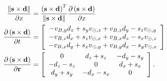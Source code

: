 \begin{align}
	\frac{\| \mathbf{s} \times \mathbf{d} \|}{\partial x} &= \frac{\left( \mathbf{s} \times \mathbf{d} \right)^T}{\| \mathbf{s} \times \mathbf{d} \|} \frac{\partial \left( \mathbf{s} \times \mathbf{d} \right)}{\partial x} \\
	\frac{\partial \left( \mathbf{s} \times \mathbf{d} \right)}{\partial t} &= \left[ \begin{array}{c}
	-v_{B,y} d_z + s_y v_{\odot, z} + v_{B, z} d_y - s_z v_{\odot, y} \\
	-v_{B,z} d_x + s_z v_{\odot, x} + v_{B, x} d_z - s_x v_{\odot, z} \\
	-v_{B,x} d_y + s_x v_{\odot, y} + v_{B, y} d_x - s_y v_{\odot, x}
	\end{array} \right] \\
	\frac{\partial \left( \mathbf{s} \times \mathbf{d} \right)}{\partial \mathbf{r}} &= \left[ \begin{array}{ccc}
	0 & d_z + s_z & -d_y - s_y \\
	-d_z - s_z & 0 & d_x + s_x \\
	d_y + s_y & -d_x - s_x & 0
	\end{array} \right].
\end{align}





